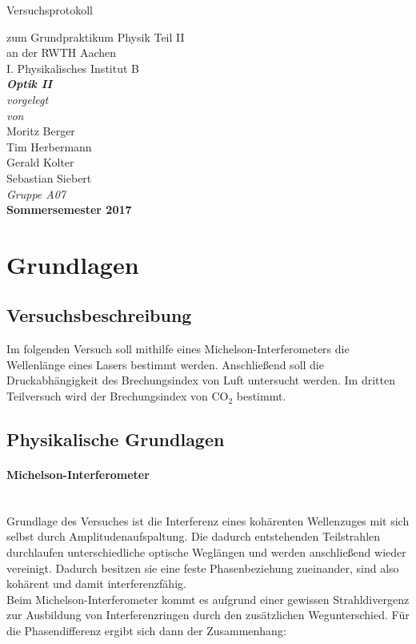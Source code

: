 \documentclass[12pt,a4paper]{article}
\author{Tim}
\begin{document}
\setlength{\parindent}{0pt}
\begin{center}
{\LARGE Versuchsprotokoll}\\
\begin{large}
zum Grundpraktikum Physik Teil II\\[0.4cm]
an der RWTH Aachen\\
I. Physikalisches Institut B\\[4.5cm]
\Large\textbf{\textsl{Optik II}}\\[4cm]
\normalsize\textit{vorgelegt\\von}\\[0.4cm]
\large{Moritz Berger\\Tim Herbermann\\Gerald Kolter\\Sebastian Siebert}\\[1cm]
\large \textit{Gruppe A07} \\ [3cm]
\large \textbf{Sommersemester 2017}
\end{large}
\end{center}
\newpage

\tableofcontents
\newpage

\section{Grundlagen}

\subsection{Versuchsbeschreibung}
Im folgenden Versuch soll mithilfe eines Michelson-Interferometers die Wellenlänge eines Lasers bestimmt werden. Anschließend soll die Druckabhängigkeit des Brechungsindex von Luft untersucht werden. Im dritten Teilversuch wird der Brechungsindex von $\text{CO}_2$ bestimmt.\\

\subsection{Physikalische Grundlagen}

\paragraph{Michelson-Interferometer}\mbox{}\\
Grundlage des Versuches ist  die Interferenz eines kohärenten Wellenzuges mit sich selbst durch Amplitudenaufspaltung. Die dadurch entstehenden Teilstrahlen durchlaufen unterschiedliche optische Weglängen und werden anschließend wieder vereinigt. Dadurch besitzen sie eine feste Phasenbeziehung zueinander,  sind also kohärent und damit interferenzfähig.\\
Beim Michelson-Interferometer kommt es aufgrund einer gewissen Strahldivergenz zur Ausbildung von Interferenzringen durch den zusätzlichen Wegunterschied. Für die Phasendifferenz ergibt sich dann der Zusammenhang:
 
\end{document}
